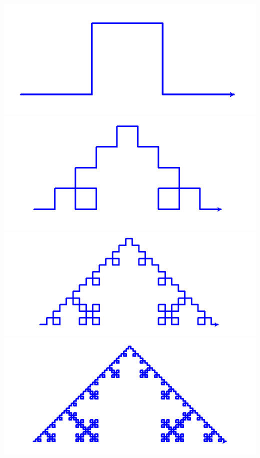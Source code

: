 \documentclass[11pt,class=report,crop=false]{standalone}
\begin{document}
\begin{exemple}
\begin{center}
\includegraphics[scale=\myscale,scale=0.22]{figures/ecran-lsysteme-3a}
\includegraphics[scale=\myscale,scale=0.22]{figures/ecran-lsysteme-3b}
\includegraphics[scale=\myscale,scale=0.22]{figures/ecran-lsysteme-3c}
\includegraphics[scale=\myscale,scale=0.22]{figures/ecran-lsysteme-3d}

\end{center}
\end{exemple}
\end{document}
